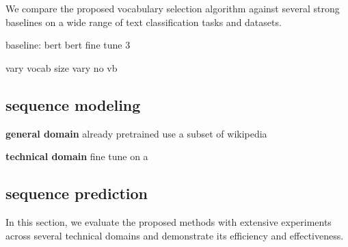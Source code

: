 We compare the proposed vocabulary selection algorithm against several strong baselines on a wide range of text classification tasks and datasets. 

baseline: bert
bert fine tune 3

vary vocab size
vary no vb

\subsection{sequence modeling}


\noindent \textbf{general domain}
already pretrained
use a subset of wikipedia


\noindent \textbf{technical domain}
fine tune on a 

\subsection{sequence prediction}



In this section, we evaluate the proposed methods with extensive experiments across several technical domains and demonstrate its efficiency and effectiveness. 

\begin{table}
\centering
\caption{Dataset Statistics}\label{tab:dataset-stats}
\vspace{5pt}
\end{table}




